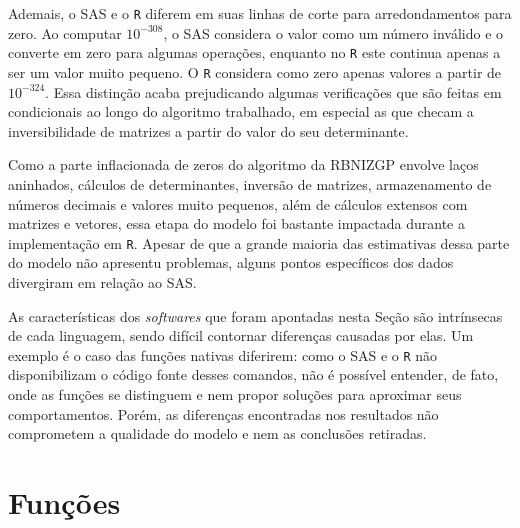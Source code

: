 \documentclass[12pt, a4paper, twoside]{report}
\numberwithin{equation}{section} %
\begin{document}
Ademais, o SAS e o \texttt{R} diferem em suas linhas de corte para arredondamentos para zero. Ao computar $10^{-308}$, o SAS considera o valor como um número inválido e o converte em zero para algumas operações, enquanto no \texttt{R} este continua apenas a ser um valor muito pequeno. O \texttt{R} considera como zero apenas valores a partir de $10^{-324}$. Essa distinção acaba prejudicando algumas verificações que são feitas em condicionais ao longo do algoritmo trabalhado, em especial as que checam a inversibilidade de matrizes a partir do valor do seu determinante.

Como a parte inflacionada de zeros do algoritmo da RBNIZGP envolve laços aninhados, cálculos de determinantes, inversão de matrizes, armazenamento de números decimais e valores muito pequenos, além de cálculos extensos com matrizes e vetores, essa etapa do modelo foi bastante impactada durante a implementação em \texttt{R}. Apesar de que a grande maioria das estimativas dessa parte do modelo não apresentu problemas, alguns pontos específicos dos dados divergiram em relação ao SAS.


As características dos \textit{softwares} que foram apontadas nesta Seção são intrínsecas de cada linguagem, sendo difícil contornar diferenças causadas por elas. Um exemplo é o caso das funções nativas diferirem: como o SAS e o \texttt{R} não disponibilizam o código fonte desses comandos, não é possível entender, de fato, onde as funções se distinguem e nem propor soluções para aproximar seus comportamentos. Porém, as diferenças encontradas nos resultados não comprometem a qualidade do modelo e nem as conclusões retiradas.



\section{Funções}\label{secao_5_3}
\end{document}
